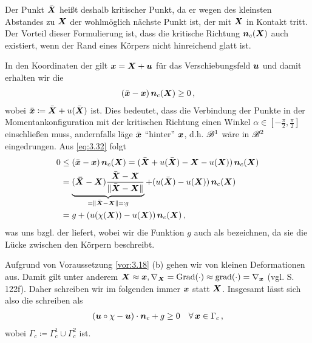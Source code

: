 \begin{bem}\label{bem:3.19}
Der Punkt $\bar{\boldsymbol X}$ heißt deshalb kritischer Punkt, da er wegen des kleinsten Abstandes zu $\boldsymbol X$ der wohlmöglich nächste Punkt ist, der mit $\boldsymbol X$ in Kontakt tritt. Der Vorteil dieser Formulierung ist, dass die kritische Richtung $\boldsymbol n_c(\boldsymbol X)$ auch existiert, wenn der Rand eines Körpers nicht hinreichend glatt ist.
\end{bem}


In den Koordinaten der  gilt $\boldsymbol x = \boldsymbol X + \boldsymbol u$ für das Verschiebungsfeld $\boldsymbol u$ und damit erhalten wir die \textit{}
\begin{align}\label{eq:3.32}
	(\bar{\boldsymbol x} - \boldsymbol x) \, \boldsymbol n_c (\boldsymbol X) \ge 0 \, , 
\end{align}
wobei $\bar{\boldsymbol x} \coloneqq \bar{\boldsymbol X} + u(\bar{\boldsymbol X})$ ist. Dies bedeutet, dass die Verbindung der Punkte in der Momentankonfiguration mit der kritischen Richtung einen Winkel $\alpha \in [-\frac \pi2,\frac \pi2]$ einschließen muss, andernfalls läge $\bar{\boldsymbol x}$ "`hinter"' $\boldsymbol x$, d.h. $\mathscr B^1$ wäre in $\mathscr B^2$ eingedrungen. Aus \eqref{eq:3.32} folgt
\begin{align*}
	0 &  \le (\bar{\boldsymbol x} - \boldsymbol x) \, \boldsymbol n_c (\boldsymbol X) = (\bar{\boldsymbol X} + u(\bar{\boldsymbol X}) -{\boldsymbol X} - u({\boldsymbol X})) \, \boldsymbol n_c(\boldsymbol X) \\
	& = \underbrace{(\boldsymbol{\bar X} - \boldsymbol X) \frac{\bar{\boldsymbol X}-\boldsymbol X}{\lVert \bar{\boldsymbol X}-\boldsymbol X\rVert}}_{ = \lVert \bar{\boldsymbol X}-\boldsymbol X\rVert\eqqcolon g} + ( u(\bar{\boldsymbol X})  - u({\boldsymbol X})) \, \boldsymbol n_c(\boldsymbol X) \\
	& = g + ( u(\chi(\boldsymbol X))  - u({\boldsymbol X})) \, \boldsymbol n_c(\boldsymbol X) \, ,
\end{align*}
was uns  bzgl. der  liefert, wobei wir die Funktion $g$ auch als \textit{} bezeichnen, da sie die Lücke zwischen den Körpern beschreibt.

Aufgrund von Voraussetzung \ref{vor:3.18} (b) gehen wir von kleinen Deformationen aus. Damit gilt unter anderem  $\boldsymbol X \approx \boldsymbol x,  \nabla_{\boldsymbol X} =\operatorname{Grad}(\cdot)\approx \operatorname{grad}(\cdot) =  \nabla_{\boldsymbol x}$ (vgl. \cite{AltKonti} S. 122f). Daher schreiben wir im folgenden immer $\boldsymbol x$ statt $\boldsymbol X$. Insgesamt lässt sich also die  schreiben als
\begin{align}\label{eq:3.33}
	(\boldsymbol u \circ \chi -\boldsymbol u) \cdot \boldsymbol n_c + g \ge 0 \quad \forall \, \boldsymbol x \in \Gamma_c \, ,
\end{align}
wobei $\Gamma_c \coloneqq \Gamma_c^1 \cup \Gamma_c^2$ ist.


